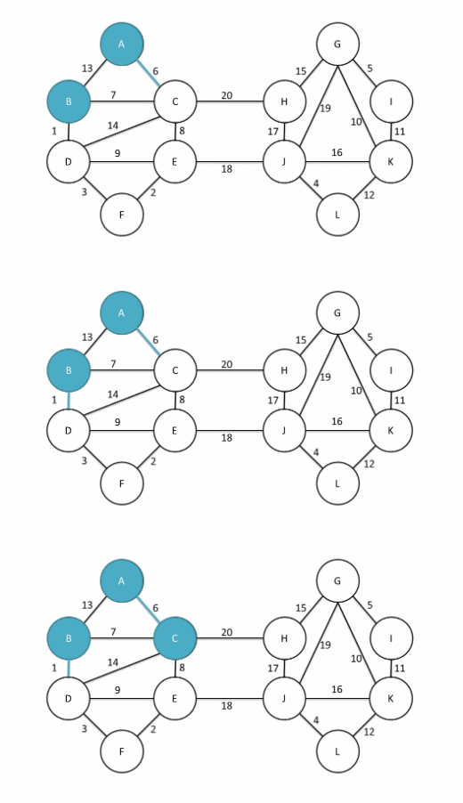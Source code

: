 \documentclass[
	11pt, %
]{beamer}
\begin{document}
\begin{frame}
    \includegraphics[width = 1\textwidth]{baruvka-example/frame_03_delay-1s.png}
\end{frame}
\begin{frame}
    \includegraphics[width = 1\textwidth]{baruvka-example/frame_04_delay-1s.png}
\end{frame}
\begin{frame}
    \includegraphics[width = 1\textwidth]{baruvka-example/frame_05_delay-2s.png}
\end{frame}
\end{document}
